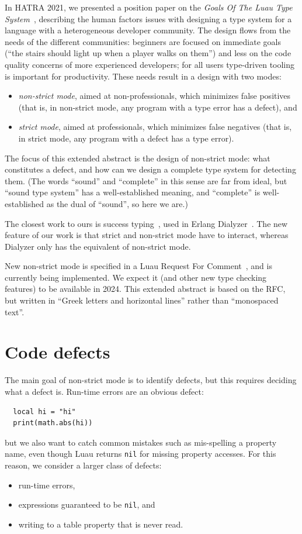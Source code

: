 \documentclass[sigplan]{acmart}
\begin{document}
In HATRA 2021, we presented a position paper on the \emph{Goals Of The Luau Type
System}~\cite{BFJ21:GoalsLuau}, describing the human factors issues
with designing a type system for a language with a heterogeneous
developer community. The design flows from the needs of the different
communities: beginners are focused on immediate goals (``the stairs
should light up when a player walks on them'') and less on the code
quality concerns of more experienced developers; for all users
type-driven tooling is important for productivity. These needs result in a design with two modes:
\begin{itemize}
\item \emph{non-strict mode}, aimed at non-professionals, which
  minimizes false positives (that is, in non-strict mode, any program with a type error has a defect), and
\item \emph{strict mode}, aimed at professionals, which
  minimizes false negatives (that is, in strict mode, any program with a defect has a type error).
\end{itemize}
The focus of this extended abstract is the design of non-strict mode: what constitutes
a defect, and how can we design a complete type system for detecting them.
(The words ``sound'' and ``complete'' in this sense are far from ideal,
but ``sound type system'' has a well-established meaning, and ``complete''
is well-established as the dual of ``sound'', so here we are.)

The closest work to ours is success typing~\cite{SuccessTyping}, used
in Erlang Dialyzer~\cite{Dialyzer}.  The new feature of our work is
that strict and non-strict mode have to interact, whereas Dialyzer only has
the equivalent of non-strict mode.

New non-strict mode is specified in a Luau Request For
Comment~\cite{NewNonStrictRFC}, and is currently being implemented.
We expect it (and other new type checking features) to be available in
2024. This extended abstract is based on the RFC, but written in
``Greek letters and horizontal lines'' rather than ``monospaced text''.

\section{Code defects}

The main goal of non-strict mode is to identify defects, but this requires
deciding what a defect is. Run-time errors are an obvious defect:
\begin{verbatim}
  local hi = "hi"
  print(math.abs(hi))
\end{verbatim}
but we also want to catch common mistakes such as mis-spelling a property name,
even though Luau returns \verb|nil| for missing property accesses.
For this reason, we consider a larger class of defects:
\begin{itemize}
\item run-time errors,
\item expressions guaranteed to be \verb|nil|, and
\item writing to a table property that is never read.
\end{itemize}
\end{document}
